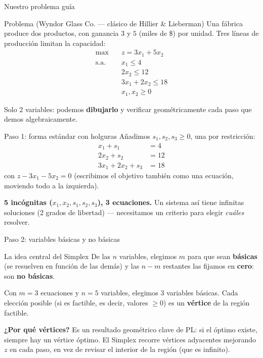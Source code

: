 \documentclass[aspectratio=169]{beamer}
\begin{document}
\begin{frame}{Nuestro problema guía}
\begin{block}{Problema (Wyndor Glass Co. --- clásico de Hillier \& Lieberman)}
Una fábrica produce dos productos, con ganancia $3$ y $5$ (miles de \$) por unidad. Tres líneas de producción limitan la capacidad:
\[
\begin{aligned}
\max \quad & z = 3x_1 + 5x_2 \\
\text{s.a.} \quad & x_1 \leq 4 \\
& 2x_2 \leq 12 \\
& 3x_1 + 2x_2 \leq 18 \\
& x_1, x_2 \geq 0
\end{aligned}
\]
\end{block}
Solo 2 variables: podemos \textbf{dibujarlo} y verificar geométricamente cada paso que demos algebraicamente.
\end{frame}

\begin{frame}{Paso 1: forma estándar con holguras}
Añadimos $s_1,s_2,s_3\geq0$, una por restricción:
\[
\begin{aligned}
x_1 + s_1 &= 4 \\
2x_2 + s_2 &= 12 \\
3x_1 + 2x_2 + s_3 &= 18
\end{aligned}
\]
con $z - 3x_1 - 5x_2 = 0$ (escribimos el objetivo también como una ecuación, moviendo todo a la izquierda).

\vspace{0.3cm}
\textbf{5 incógnitas ($x_1,x_2,s_1,s_2,s_3$), 3 ecuaciones.} Un sistema así tiene infinitas soluciones (2 grados de libertad) --- necesitamos un criterio para elegir \emph{cuáles} resolver.
\end{frame}

\begin{frame}{Paso 2: variables básicas y no básicas}
\begin{block}{La idea central del Simplex}
De las $n$ variables, elegimos $m$ para que sean \textbf{básicas} (se resuelven en función de las demás) y las $n-m$ restantes las fijamos en \textbf{cero}: son \textbf{no básicas}.
\end{block}

Con $m=3$ ecuaciones y $n=5$ variables, elegimos 3 variables básicas. Cada elección posible (si es factible, es decir, valores $\geq 0$) es un \textbf{vértice} de la región factible.

\vspace{0.3cm}
\textbf{¿Por qué vértices?} Es un resultado geométrico clave de PL: si el óptimo existe, siempre hay un vértice óptimo. El Simplex recorre vértices adyacentes mejorando $z$ en cada paso, en vez de revisar el interior de la región (que es infinito).
\end{frame}
\end{document}
